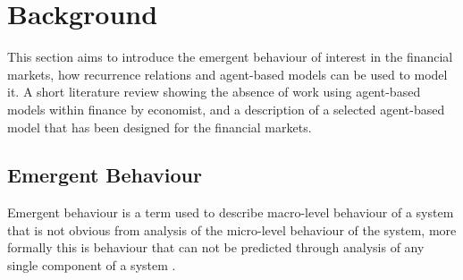 \documentclass{article}
\begin{document}







\section{Background}
This section aims to introduce the emergent behaviour of interest in the financial markets, how recurrence relations and agent-based models can be used to model it. A short literature review showing the absence of work using agent-based models within finance by economist, and a description of a selected agent-based model that has been designed for the financial markets. 

\subsection{Emergent Behaviour}
Emergent behaviour is a term used to describe macro-level behaviour of a system that is not obvious from analysis of the micro-level behaviour of the system, more formally this is behaviour that can not be predicted through analysis of any single component of a system \cite{EB_systemofsystemsGLangford}.
\end{document}
